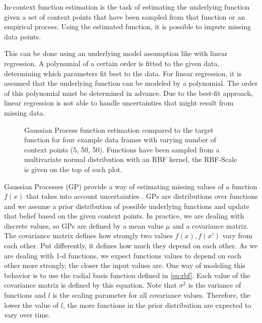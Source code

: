 In-context function estimation is the task of estimating the underlying function given a set of context points that have been sampled from that function or an empirical process. Using the estimated function, it is possible to impute missing data points. \cite{seifner2025zeroshotimputationfoundationinference}

This can be done using an underlying model assumption like with linear regression. A polynomial of a certain order is fitted to the given data, determining which parameters fit best to the data. For linear regression, it is assumed that the underlying function can be modeled by a polynomial. The order of this polynomial must be determined in advance. Due to the best-fit approach, linear regression is not able to handle uncertainties that might result from missing data.

\begin{figure*}
	\centering
	\resizebox{0.90\textwidth}{!}{
		
		
		
	}
	\caption{Gaussian Process function estimation compared to the target function for four example data frames with varying number of context points (5, 50, 50). Functions have been sampled from a multivariate normal distribution with an RBF kernel, the RBF-Scale is given on the top of each plot. }
	\label{fig:gaussian}
\end{figure*}

Gaussian Processes (GP) provide a way of estimating missing values of a function $f(x)$ that takes into account uncertainties . GPs are distributions over functions and we assume a prior distribution of possible underlying functions and update that belief based on the given context points. In practice, we are dealing with discrete values, so GPs are defined by a mean value $\mu$ and a covariance matrix. The covariance matrix defines how strongly two values $f(x),f(x')$ vary from each other. Put differently, it defines how much they depend on each other. As we are dealing with 1-d functions, we expect functions values to depend on each other more strongly, the closer the input values are. One way of modeling this behavior is to use the radial basis function defined in \autoref{eq:rbf}. Each value of the covariance matrix is defined by this equation. Note that $\sigma^2$ is the variance of functions and $l$ is the scaling parameter for all covariance values. Therefore, the lower the value of $l$, the more functions in the prior distribution are expected to vary over time. \cite{garnelo2018neural, williams2006gaussian}

